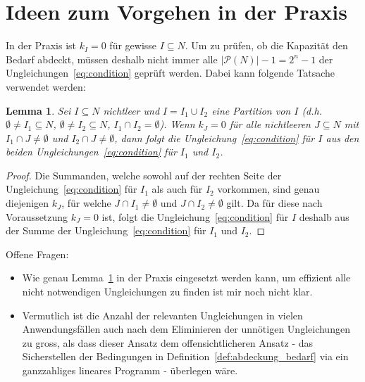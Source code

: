 \documentclass{article}
\newtheorem{lemma}{Lemma}
\newcommand{\powerset}{\ensuremath{\mathcal{P}}}
\begin{document}
	\section{Ideen zum Vorgehen in der Praxis}
	In der Praxis ist $k_I = 0$ für gewisse  $I\subseteq N$. Um zu prüfen, ob die Kapazität den Bedarf abdeckt, müssen deshalb nicht immer alle $\left|\powerset(N)\right| - 1 =  2^n - 1$ der Ungleichungen~\ref{eq:condition} geprüft werden. Dabei kann folgende Tatsache verwendet werden:
	\begin{lemma}
		\label{def:lemma_partitionen}
		Sei $I\subseteq N$ nichtleer und $I = I_1 \cup I_2$ eine Partition von $I$ (d.h. $\emptyset\neq I_1\subseteq N$, $\emptyset\neq I_2\subseteq N$, $I_1 \cap I_2 = \emptyset$).
		Wenn $k_J=0$ für alle nichtleeren $J\subseteq N$ mit $I_1 \cap J\neq \emptyset$ und $I_2 \cap J\neq \emptyset$, dann folgt die Ungleichung~\ref{eq:condition} für $I$ aus den beiden Ungleichungen~\ref{eq:condition} für $I_1$ und $I_2$.
	\end{lemma}
	\begin{proof}
		Die Summanden, welche sowohl auf der rechten Seite der Ungleichung~\ref{eq:condition} für $I_1$ als auch für $I_2$ vorkommen, sind genau diejenigen $k_J$, für welche $J\cap I_1\neq \emptyset$ und $J\cap I_2\neq \emptyset$ gilt. Da für diese nach Voraussetzung $k_J=0$ ist, folgt die Ungleichung~\ref{eq:condition} für $I$ deshalb aus der Summe der Ungleichung~\ref{eq:condition} für $I_1$ und $I_2$.
	\end{proof}

	Offene Fragen:
	\begin{itemize}
		\item Wie genau Lemma~\ref{def:lemma_partitionen} in der Praxis eingesetzt werden kann, um effizient alle nicht notwendigen Ungleichungen zu finden ist mir noch nicht klar.
		\item Vermutlich ist die Anzahl der relevanten Ungleichungen in vielen Anwendungsfällen auch nach dem Eliminieren der unnötigen Ungleichungen zu gross, als dass dieser Ansatz dem offensichtlicheren Ansatz - das Sicherstellen der Bedingungen in Definition~\ref{def:abdeckung_bedarf} via ein ganzzahliges lineares Programm - überlegen wäre.
	\end{itemize}
	
\end{document}
